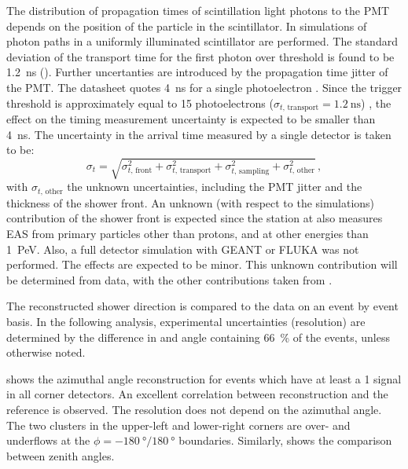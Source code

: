 The distribution of propagation times of scintillation light photons to the PMT
depends on the position of the particle in the scintillator.  In
\cite{Steijger:2010-time} simulations of photon paths
in a uniformly illuminated \hisparc scintillator are performed.  The standard
deviation of the transport time for the first photon over threshold is found to
be \SI{1.2}{\nano\second} ().  Further
uncertanties are introduced by the propagation time jitter of the PMT.
The datasheet quotes \SI{4}{\nano\second} for a single
photoelectron \cite{9107B}. Since the trigger threshold is approximately equal
to 15 photoelectrons ($\sigma_{t,\, \mathrm{transport}} =
\SI{1.2}{\nano\second}$) \cite{Steijger:2010-time}, the effect on the timing
measurement uncertainty is expected to be smaller than \SI{4}{\nano\second}. The
uncertainty in the arrival time measured by a single detector is taken to
be:
\begin{equation}
\label{eq:kascade-timings}
\sigma_t = \sqrt{\sigma_{t,\, \mathrm{front}}^2 + \sigma_{t,\,
\mathrm{transport}}^2 + \sigma_{t,\, \mathrm{sampling}}^2 + \sigma_{t,\,
\mathrm{other}}^2}\,,
\end{equation}
with $\sigma_{t,\, \mathrm{other}}$ the unknown uncertainties, including the PMT
jitter and the thickness of the shower front. An unknown (with respect to the
simulations) contribution of the shower front is expected since the \hisparc
station at \kascade also measures EAS from primary particles other than protons,
and at other energies than \SI{1}{\peta\electronvolt}. Also, a full detector
simulation with GEANT or FLUKA was not performed.
The effects are expected to be minor. This unknown contribution will be
determined from data, with the other contributions taken from
.

The \hisparc reconstructed shower direction is compared to the \kascade data on
an event by event basis.
In the following analysis,
experimental uncertainties (resolution) are determined by the
difference in \hisparc and \kascade angle containing \SI{66}{\percent} of the
events, unless otherwise noted.

 shows the azimuthal angle reconstruction for
events which have at least a \SI{1}{\mip} signal in all corner detectors.
An excellent correlation between \hisparc reconstruction and the \kascade
reference is observed.  The resolution does not depend on the azimuthal
angle.  The two clusters in the upper-left and lower-right corners are
over- and underflows at the $\phi = \SI{-180}{\degree} /
\SI{180}{\degree}$ boundaries.  Similarly, 
shows the comparison between zenith angles.

